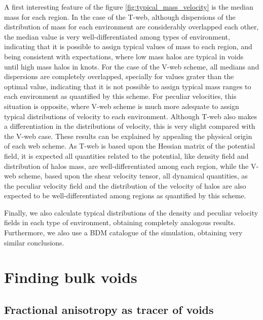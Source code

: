 \documentclass[a4,useAMS,usenatbib,usegraphicx]{latex/mn2e}
\begin{document}
A first interesting feature of the figure  \ref{fig:typical_mass_velocity} 
is the median mass for each region. In the case of the T-web, although 
dispersions of the distribution of mass for each environment are 
considerably overlapped each other, the median value is very 
well-differentiated among types of environment, indicating that it is 
possible to assign typical values of mass to each region, and being 
consistent with expectations, where low mass halos are typical in voids 
until high mass halos in knots. For the case of the V-web scheme, all
medians and dispersions are completely overlapped, specially for values 
grater than the optimal \lth value, indicating that it is not possible to
assign typical mass ranges to each environment as quantified by this 
scheme. For peculiar velocities, this situation is opposite, where V-web
scheme is much more adequate to assign typical distributions of velocity
to each environment. Although T-web also makes a differentiation in the 
distributions of velocity, this is very slight compared with the V-web 
case. These results can be explained by appealing the physical origin of 
each web scheme. As T-web is based upon the Hessian matrix of the 
potential field, it is expected all quantities related to the potential, 
like density field and distribution of halos mass, are well-differentiated 
among each region, while the V-web scheme, based upon the shear velocity 
tensor, all dynamical quantities, as the peculiar velocity field and the 
distribution of the velocity of halos are also expected to be 
well-differentiated among regions as quantified by this scheme.



Finally, we also calculate typical distributions of the density and 
peculiar velocity fields in each type of environment, obtaining completely
analogous results. Furthermore, we also use a BDM catalogue of the 
simulation, obtaining very similar conclusions.



\section{Finding bulk voids}
\label{sec:bulk_voids}


\subsection{Fractional anisotropy as tracer of voids}
\label{subsec:FA_voids}
\end{document}
